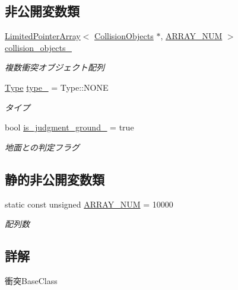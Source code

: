 \subsection*{非公開変数類}
\begin{DoxyCompactItemize}
\item 
\mbox{\hyperlink{class_limited_pointer_array}{Limited\+Pointer\+Array}}$<$ \mbox{\hyperlink{class_collision_objects}{Collision\+Objects}} $\ast$, \mbox{\hyperlink{class_collision_base_a0ddcdd5ed993b19c6edabd9c50e76ba4}{A\+R\+R\+A\+Y\+\_\+\+N\+UM}} $>$ \mbox{\hyperlink{class_collision_base_a9ef8dfac9a07e31cb1d058b6a22e9640}{collision\+\_\+objects\+\_\+}}
\begin{DoxyCompactList}\small\item\em 複数衝突オブジェクト配列 \end{DoxyCompactList}\item 
\mbox{\hyperlink{class_collision_base_a18dc0d5461742083ca12013fe9ff1a20}{Type}} \mbox{\hyperlink{class_collision_base_a254487778b15b900d763ebf0bf153c3e}{type\+\_\+}} = Type\+::\+N\+O\+NE
\begin{DoxyCompactList}\small\item\em タイプ \end{DoxyCompactList}\item 
bool \mbox{\hyperlink{class_collision_base_acc56eed7a6366d77bb2b80810f0a4ea7}{is\+\_\+judgment\+\_\+ground\+\_\+}} = true
\begin{DoxyCompactList}\small\item\em 地面との判定フラグ \end{DoxyCompactList}\end{DoxyCompactItemize}
\subsection*{静的非公開変数類}
\begin{DoxyCompactItemize}
\item 
static const unsigned \mbox{\hyperlink{class_collision_base_a0ddcdd5ed993b19c6edabd9c50e76ba4}{A\+R\+R\+A\+Y\+\_\+\+N\+UM}} = 10000
\begin{DoxyCompactList}\small\item\em 配列数 \end{DoxyCompactList}\end{DoxyCompactItemize}


\subsection{詳解}
衝突\+Base\+Class 

